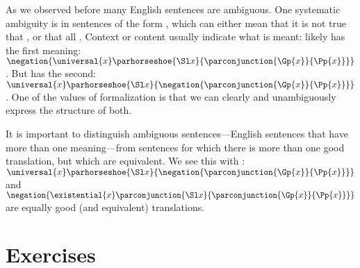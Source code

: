 As we observed before many English sentences are ambiguous.
One systematic ambiguity is in sentences of the form , which can either mean that it is not true that , or that all .
Context or content usually indicate what is meant:   likely has the first meaning: $\negation{\universal{\variable{x}}\parhorseshoe{\Sl\variable{x}}{\parconjunction{\Gp{\variable{x}}}{\Pp{\variable{x}}}}}$.
But  has the second: $\universal{\variable{x}}\parhorseshoe{\Sl\variable{x}}{\negation{\parconjunction{\Gp{\variable{x}}}{\Pp{\variable{x}}}}}$.
One of the values of formalization is that we can clearly and unambiguously express the structure of both.

It is important to distinguish ambiguous sentences---English sentences that have more than one meaning---from sentences for which there is more than one good translation, but which are equivalent.
We see this with : $\universal{\variable{x}}\parhorseshoe{\Sl\variable{x}}{\negation{\parconjunction{\Gp{\variable{x}}}{\Pp{\variable{x}}}}}$ and $\negation{\existential{\variable{x}}\parconjunction{\Sl\variable{x}}{\parconjunction{\Gp{\variable{x}}}{\Pp{\variable{x}}}}}$ are equally good (and equivalent) translations.

\section{Exercises}

